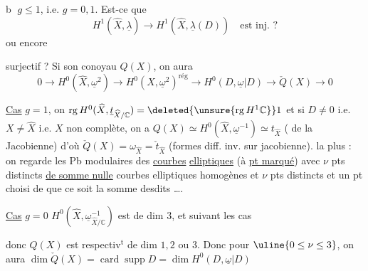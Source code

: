 \textcircled{b} $g\leq1$, i.e. $g=0,1$. Est-ce que
\[
H^1(\widehat X,\underline\lambda)\longrightarrow H^1(\widehat X,\underline\lambda(D))
\quad\text{est inj. ?}
\]
ou encore


 surjectif ? Si son conoyau \unsure{$\rightarrow$}
$Q(X)$, on aura
\[
0\longrightarrow H^0(\widehat X,\underline\omega^2)\longrightarrow
H^0(X,\underline\omega^2)^{\mathrm{rég}}\longrightarrow
H^0(D,\underline\omega|D)\longrightarrow\check Q(X)\longrightarrow0
\]

\uline{Cas} $g=1$, on  $\operatorname{rg} H^0(\widehat X,\underline t_{\widehat X/\mathbb C})=\deleted{\unsure{\operatorname{rg}H^1\mathbb C}}1$
et si $D\ne0$ i.e. $X\ne\widehat X$ i.e. $X$ non complète,
on a $Q(X)\simeq H^0(\widehat X,\underline\omega^{-1})\simeq t_{\widehat X}$
( de
la Jacobienne) d'où $\check Q(X)=\omega_{\widehat X}=\check t_{\widehat X}$ (formes
diff. inv. sur jacobienne).  la plus  :
on regarde les Pb modulaires des \uline{courbes}
\uline{elliptiques} (à \uline{pt marqué}) avec $\nu$ pts
distincts \uline{de somme nulle} 
courbes elliptiques  homogènes et
$\nu$ pts  distincts et un pt choisi
de  que ce soit la somme desdits \ldots.

\uline{Cas} $g=0$ 
$H^0(\widehat X,\underline\omega^{-1}_{\widehat X/\mathbb C})$ est de dim $3$, et
suivant les cas


donc $Q(X)$ est respectiv$^{\mathrm{t}}$ de dim $1,2$ ou $3$.
Donc pour $\uline{0\leq\nu\leq3}$, on aura $\dim\check Q(X)=\operatorname{card}\operatorname{supp}D
=\dim H^0(D,\underline\omega|D)$
